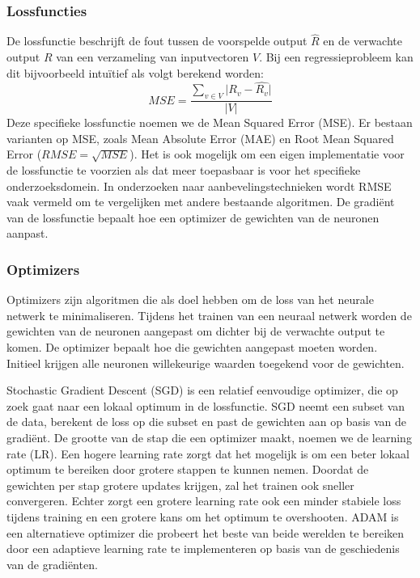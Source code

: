 \subsubsection{Lossfuncties}
\label{sec:chapt2_ml_loss_functions}
De lossfunctie beschrijft de fout tussen de voorspelde output $\hat{R}$ en de verwachte output $R$ van een verzameling van inputvectoren $V$. Bij een regressieprobleem kan dit bijvoorbeeld intuïtief als volgt berekend worden:
\begin{equation}
    MSE = \frac{\sum_{v \in V} \lvert R_v - \hat{R_v}\rvert}{\lvert V \rvert}   
    \label{eq:chapt2_mse}
\end{equation}
Deze specifieke lossfunctie noemen we de Mean Squared Error (MSE). Er bestaan varianten op MSE, zoals Mean Absolute Error (MAE) en Root Mean Squared Error ($RMSE = \sqrt{MSE}$). Het is ook mogelijk om een eigen implementatie voor de lossfunctie te voorzien als dat meer toepasbaar is voor het specifieke onderzoeksdomein. In onderzoeken naar aanbevelingstechnieken wordt RMSE vaak vermeld om te vergelijken met andere bestaande algoritmen. \cite{narre, deepconn, wide_deep_learning_paper} De gradiënt van de lossfunctie bepaalt hoe een optimizer de gewichten van de neuronen aanpast.

\subsubsection{Optimizers}
Optimizers zijn algoritmen die als doel hebben om de loss van het neurale netwerk te minimaliseren. Tijdens het trainen van een neuraal netwerk worden de gewichten van de neuronen aangepast om dichter bij de verwachte output te komen. De optimizer bepaalt hoe die gewichten aangepast moeten worden. Initieel krijgen alle neuronen willekeurige waarden toegekend voor de gewichten.

Stochastic Gradient Descent (SGD) is een relatief eenvoudige optimizer, die op zoek gaat naar een lokaal optimum in de lossfunctie. SGD neemt een subset van de data, berekent de loss op die subset en past de gewichten aan op basis van de gradiënt. \cite{SGD_paper} De grootte van de stap die een optimizer maakt, noemen we de learning rate (LR). Een hogere learning rate zorgt dat het mogelijk is om een beter lokaal optimum te bereiken door grotere stappen te kunnen nemen. Doordat de gewichten per stap grotere updates krijgen, zal het trainen ook sneller convergeren. Echter zorgt een grotere learning rate ook een minder stabiele loss tijdens training en een grotere kans om het optimum te overshooten. \newline
ADAM is een alternatieve optimizer die probeert het beste van beide werelden te bereiken door een adaptieve learning rate te implementeren op basis van de geschiedenis van de gradiënten. \cite{adam_paper}

